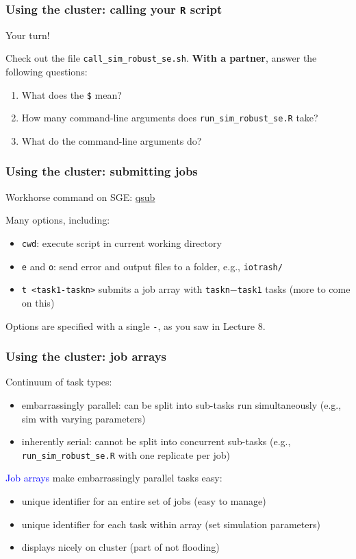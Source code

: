 \documentclass[12pt, 
hyperref={colorlinks=true, linkcolor=BlueViolet, urlcolor=BlueViolet},dvipsnames]{beamer}
\begin{document}
\begin{frame}
\frametitle{Using the cluster: calling your \texttt{R} script}

Your turn!

Check out the file \texttt{call\_sim\_robust\_se.sh}. \textbf{With a partner}, answer the following questions: \vspace{-0.3cm}
\begin{enumerate}
\item What does the \texttt{\$} mean?
\item How many command-line arguments does \texttt{run\_sim\_robust\_se.R} take?
\item What do the command-line arguments do?
\end{enumerate}
\end{frame}

\begin{frame}
\frametitle{Using the cluster: submitting jobs}
Workhorse command on SGE: \href{http://gridscheduler.sourceforge.net/htmlman/htmlman1/qsub.html}{qsub}

Many options, including: \vspace{-0.3cm} \pause
\begin{itemize}
\item \texttt{cwd}: execute script in current working directory \pause
\item \texttt{e} and \texttt{o}: send error and output files to a folder, e.g., \texttt{iotrash/} \pause
\item \texttt{t <task1-taskn>} submits a job array with \texttt{taskn}$-$\texttt{task1} tasks \pause (more to come on this)
\end{itemize}

Options are specified with a single \texttt{-}, as you saw in Lecture 8.
\end{frame}

\begin{frame}
\frametitle{Using the cluster: job arrays}

Continuum of task types: \vspace{-0.3cm} \pause
\begin{itemize}
\item embarrassingly parallel: \pause can be split into sub-tasks run simultaneously \pause (e.g., sim with varying parameters)
\item inherently serial: \pause cannot be split into concurrent sub-tasks \pause (e.g., \texttt{run\_sim\_robust\_se.R} with one replicate per job) \pause
\end{itemize}

\textcolor{blue}{Job arrays} make embarrassingly parallel tasks easy: \vspace{-0.3cm} \pause
\begin{itemize}
\item unique identifier for an entire set of jobs \pause (easy to manage) \pause
\item unique identifier for each task within array \pause (set simulation parameters) \pause
\item displays nicely on cluster \pause (part of not flooding) 
\end{itemize}
\end{frame}
\end{document}
